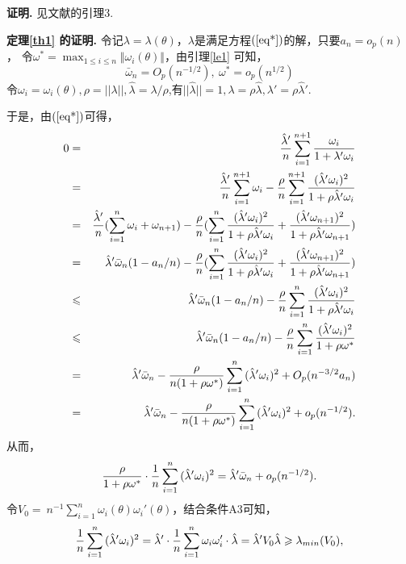 \documentclass[a4paper,c5size,onecolumn,twoside,cap,Chinese]{APSart}
\begin{document}
{\bf 证明. }见文献的引理3.


{\bf 定理\ref{th1} 的证明. }令记$\lambda=\lambda(\theta)$，$\lambda$是满足方程$(\ref{eq*})$的解，只要\( a_n=o_p(n)\)，
令\( \omega^* = \max_{ 1\leq i\leq n} \Vert  \omega_i(\theta) \Vert  \)，由引理\ref{le1} 可知，
$$  \bar{\omega}_{n}=O_p(n^{-1/2}),\   \omega^* =o_p(n^{1/2})$$
令$\omega_i=\omega_i(\theta),\rho=||\lambda||,\hat{\lambda}=\lambda/\rho$,有$||\hat{\lambda}||=1,\lambda=\rho\hat{\lambda},\lambda'=\rho\hat{\lambda}'$.

于是，由$\rm(\ref{eq*}) $可得，
\begin{eqnarray*}
0 &=&{\hat{\lambda}'\over n}\sum^{n+1}_{i=1}{\omega_i \over 1+\lambda'\omega_i}\\
&=&{\hat{\lambda}'\over n}\sum^{n+1}_{i=1}{\omega_i}-{\rho\over n}\sum^{n+1}_{i=1}{(\hat{\lambda}'\omega_i)^2 \over 1+\rho\hat{\lambda}'\omega_i} \\
&=&{\hat{\lambda}'\over n}(\sum^{n}_{i=1}{\omega_i}+\omega_{n+1})-{\rho\over n}(\sum^{n}_{i=1}{(\hat{\lambda}'\omega_i)^2 \over 1+\rho\hat{\lambda}'\omega_i}+{(\hat{\lambda}'\omega_{n+1})^2 \over 1+\rho\hat{\lambda}'\omega_{n+1}})\\
&=&\hat{\lambda}'\bar{\omega}_n(1-a_n/n)-{\rho\over n}(\sum^{n}_{i=1}{(\hat{\lambda}'\omega_i)^2 \over 1+\rho\hat{\lambda}'\omega_i}+{(\hat{\lambda}'\omega_{n+1})^2 \over 1+\rho\hat{\lambda}'\omega_{n+1}})\\
&\le& \hat{\lambda}'\bar{\omega}_n(1-a_n/n)-{\rho\over n}\sum^{n}_{i=1}{(\hat{\lambda}'\omega_i)^2 \over 1+\rho\hat{\lambda}'\omega_i}\\
&\le& \hat{\lambda}'\bar{\omega}_n(1-a_n/n)-{\rho\over n}\sum^{n}_{i=1}{(\hat{\lambda}'\omega_i)^2 \over 1+\rho\omega^*}\\
&=& \hat{\lambda}'\bar{\omega}_n-{\rho\over n(1+\rho\omega^*)}\sum^{n}_{i=1}{(\hat{\lambda}'\omega_i)^2 }+O_p(n^{-3/2}a_n)\\
&=& \hat{\lambda}'\bar{\omega}_n-{\rho\over n(1+\rho\omega^*)}\sum^{n}_{i=1}{(\hat{\lambda}'\omega_i)^2 }+o_p(n^{-1/2}).
\end{eqnarray*}
从而，
$${\rho\over 1+\rho\omega^*}\cdot {1 \over n}\sum^{n}_{i=1}{(\hat{\lambda}'\omega_i)^2 }= \hat{\lambda}'\bar{\omega}_n+o_p(n^{-1/2}).$$
令$V_0 =\ n^{-1}\sum^{n}_{i=1}{\omega_i(\theta)}{\omega_i'(\theta)}$，结合条件A3可知，
$${1 \over n}\sum^{n}_{i=1}{(\hat{\lambda}'\omega_i)^2 }=\hat{\lambda}'\cdot{1 \over n}\sum^{n}_{i=1}{\omega_i\omega_i'}\cdot\hat{\lambda}=\hat{\lambda}'V_0\hat{\lambda} \ge \lambda_{min} (V_0),$$
\end{document}
